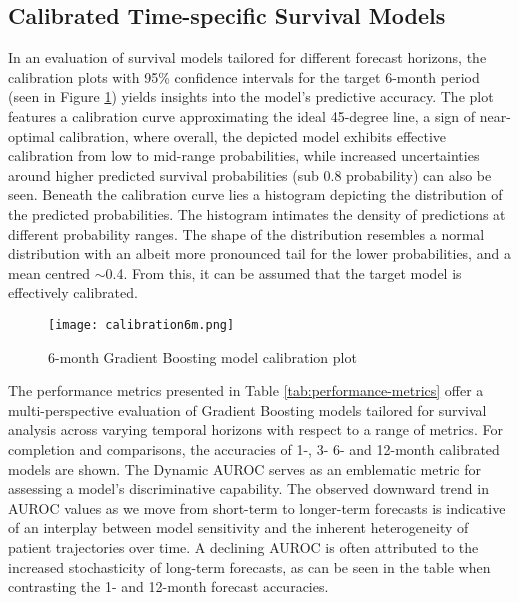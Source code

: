 \documentclass{article}
\begin{document}
\subsection{Calibrated Time-specific Survival Models}

In an evaluation of survival models tailored for different forecast horizons, the calibration plots with 95\% confidence intervals for the target 6-month period (seen in Figure \ref{fig:calibration}) yields insights into the model's predictive accuracy. The plot features a calibration curve approximating the ideal 45-degree line, a sign of near-optimal calibration, where overall, the depicted model exhibits effective calibration from low to mid-range probabilities, while increased uncertainties around higher predicted survival probabilities (sub 0.8 probability) can also be seen. Beneath the calibration curve lies a histogram depicting the distribution of the predicted probabilities. The histogram intimates the density of predictions at different probability ranges. The shape of the distribution resembles a normal distribution with an albeit more pronounced tail for the lower probabilities, and a mean centred $\sim$0.4. From this, it can be assumed that the target model is effectively calibrated.

\begin{figure}[h!]
    \centering
    \texttt{[image: calibration6m.png]}
    \caption{6-month Gradient Boosting model calibration plot}
    \label{fig:calibration}
\end{figure}


The performance metrics presented in Table \ref{tab:performance-metrics} offer a multi-perspective evaluation of Gradient Boosting models tailored for survival analysis across varying temporal horizons with respect to a range of metrics. For completion and comparisons, the accuracies of 1-, 3- 6- and 12-month calibrated models are shown. The Dynamic AUROC serves as an emblematic metric for assessing a model's discriminative capability. The observed downward trend in AUROC values as we move from short-term to longer-term forecasts is indicative of an interplay between model sensitivity and the inherent heterogeneity of patient trajectories over time. A declining AUROC is often attributed to the increased stochasticity of long-term forecasts, as can be seen in the table when contrasting the 1- and 12-month forecast accuracies.
\end{document}
